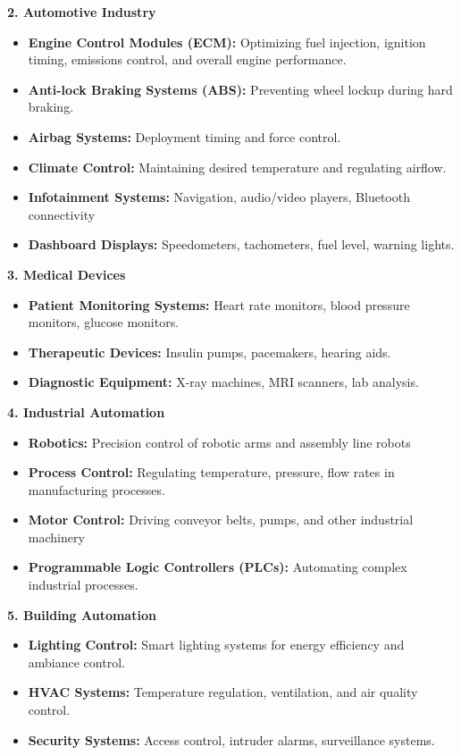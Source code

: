\documentclass[
]{article}
\begin{document}
\textbf{2. Automotive Industry}

\begin{itemize}
\item
  \textbf{Engine Control Modules (ECM):} Optimizing fuel injection,
  ignition timing, emissions control, and overall engine performance.
\item
  \textbf{Anti-lock Braking Systems (ABS):} Preventing wheel lockup
  during hard braking.
\item
  \textbf{Airbag Systems:} Deployment timing and force control.
\item
  \textbf{Climate Control:} Maintaining desired temperature and
  regulating airflow.
\item
  \textbf{Infotainment Systems:} Navigation, audio/video players,
  Bluetooth connectivity
\item
  \textbf{Dashboard Displays:} Speedometers, tachometers, fuel level,
  warning lights.
\end{itemize}

\textbf{3. Medical Devices}

\begin{itemize}
\item
  \textbf{Patient Monitoring Systems:} Heart rate monitors, blood
  pressure monitors, glucose monitors.
\item
  \textbf{Therapeutic Devices:} Insulin pumps, pacemakers, hearing aids.
\item
  \textbf{Diagnostic Equipment:} X-ray machines, MRI scanners, lab
  analysis.
\end{itemize}

\textbf{4. Industrial Automation}

\begin{itemize}
\item
  \textbf{Robotics:} Precision control of robotic arms and assembly line
  robots
\item
  \textbf{Process Control:} Regulating temperature, pressure, flow rates
  in manufacturing processes.
\item
  \textbf{Motor Control:} Driving conveyor belts, pumps, and other
  industrial machinery
\item
  \textbf{Programmable Logic Controllers (PLCs):} Automating complex
  industrial processes.
\end{itemize}

\textbf{5. Building Automation}

\begin{itemize}
\item
  \textbf{Lighting Control:} Smart lighting systems for energy
  efficiency and ambiance control.
\item
  \textbf{HVAC Systems:} Temperature regulation, ventilation, and air
  quality control.
\item
  \textbf{Security Systems:} Access control, intruder alarms,
  surveillance systems.
\end{itemize}
\end{document}
